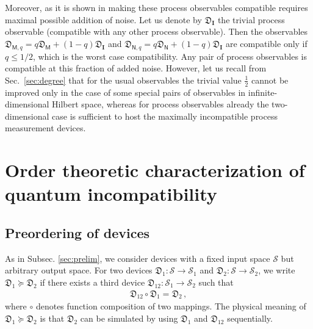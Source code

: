 \documentclass[12pt]{iopart}
\theoremstyle{definition}
\newcommand{\half}{\tfrac{1}{2}} %
\newcommand{\Mo}{\mathsf{M}}%
\newcommand{\No}{\mathsf{N}}%
\newcommand{\Dev}{\mathfrak{D}} %
\newcommand{\pgeq}{\succeq}
\begin{document}
{Moreover, as it is shown in \cite{SeReChZi15} making these process
observables compatible requires maximal possible addition of noise. 
Let us denote by $\Dev_\mathbf{I}$ the trivial process observable (compatible
with any other process observable). Then
the observables $\Dev_{\Mo,q}=q\Dev_\Mo+(1-q)\Dev_\mathbf{I}$
and $\Dev_{\No,q}=q\Dev_\No+(1-q)\Dev_\mathbf{I}$ are compatible only 
if $q\leq 1/2$, which is the worst case compatibility. Any pair of process
observables is compatible at this fraction of added noise. However, 
let us recall from Sec.~\ref{sec:degree} that for the usual observables the
trivial value $\half$ cannot be improved only in the case of some special pairs 
of observables in infinite-dimensional Hilbert space, 
whereas for process observables already the two-dimensional case is sufficient to host the maximally incompatible process measurement devices.

\section{Order theoretic characterization of quantum incompatibility}\label{sec:order}


\subsection{Preordering of devices}\label{sec:prelimorder}

As in Subsec. \ref{sec:prelim}, we consider devices with a fixed input space $\mathcal{S}$ but arbitrary output space. For two devices $\Dev_1: \mathcal{S} \to \mathcal{S}_1$ and $\Dev_2: \mathcal{S} \to \mathcal{S}_2$, 
we write $\Dev_1 \pgeq \Dev_2$ if there exists a third device $\Dev_{12}: \mathcal{S}_1 \to \mathcal{S}_2$ 
such that
\begin{align}
\Dev_{12} \circ \Dev_1 = \Dev_2 \, ,
\end{align}
where $\circ$ denotes function composition of two mappings.
The physical meaning of $\Dev_1 \pgeq \Dev_2$ is that $\Dev_2$ can be simulated by using $\Dev_1$ and $\Dev_{12}$ sequentially.

}
\end{document}
